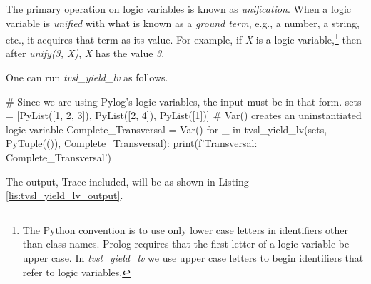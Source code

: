 The primary operation on logic variables is known as \textit{unification}. When a logic variable is \textit{unified} with what is known as a \textit{ground term}, e.g., a number, a string, etc., it acquires that term as its value. For example, if \textit{X} is a logic variable,\footnote{The Python convention is to use only lower case letters in identifiers other than class names. Prolog requires that the first letter of a logic variable be upper case. In \textit{tvsl\_yield\_lv} we use upper case letters to begin identifiers that refer to logic variables.} then after \textit{unify(3, X)}, \textit{X} has the value \textit{3}. 

One can run \textit{tvsl\_yield\_lv} as follows. 

\begin{minipage}{\linewidth} \largev 
\begin{python}
# Since we are using Pylog's logic variables, the input must be in that form.
sets = [PyList([1, 2, 3]), PyList([2, 4]), PyList([1])]
# Var() creates an uninstantiated logic variable
Complete_Transversal = Var()
for _ in tvsl_yield_lv(sets, PyTuple(()), Complete_Transversal):
    print(f'Transversal: {Complete_Transversal}\n')
\end{python}
\end{minipage}

The output, Trace included, will be as shown in Listing \ref{lis:tvsl_yield_lv_output}.




